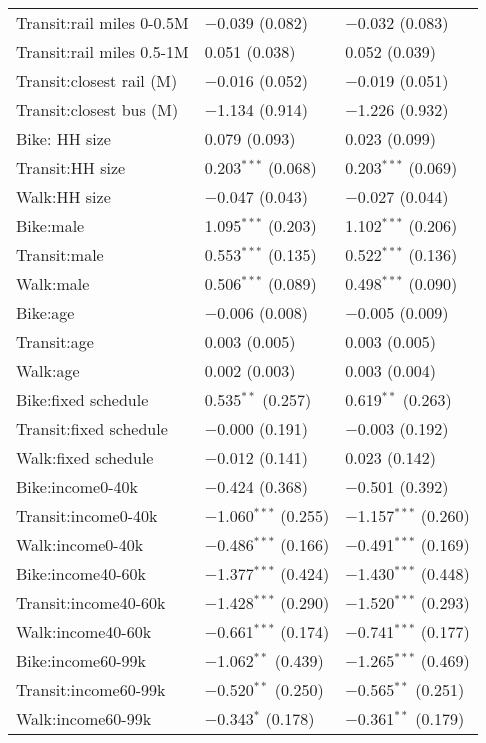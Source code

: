 \begin{longtabu}{lll}
 Transit:rail miles 0-0.5M & $-$0.039 (0.082) & $-$0.032 (0.083) \\ 
 Transit:rail miles 0.5-1M & 0.051 (0.038) & 0.052 (0.039) \\ 
 Transit:closest rail (M) & $-$0.016 (0.052) & $-$0.019 (0.051) \\ 
 Transit:closest bus (M) & $-$1.134 (0.914) & $-$1.226 (0.932) \\ 
 Bike: HH size & 0.079 (0.093) & 0.023 (0.099) \\ 
 Transit:HH size & 0.203$^{***}$ (0.068) & 0.203$^{***}$ (0.069) \\ 
 Walk:HH size & $-$0.047 (0.043) & $-$0.027 (0.044) \\ 
 Bike:male & 1.095$^{***}$ (0.203) & 1.102$^{***}$ (0.206) \\ 
 Transit:male & 0.553$^{***}$ (0.135) & 0.522$^{***}$ (0.136) \\ 
 Walk:male & 0.506$^{***}$ (0.089) & 0.498$^{***}$ (0.090) \\ 
 Bike:age & $-$0.006 (0.008) & $-$0.005 (0.009) \\ 
 Transit:age & 0.003 (0.005) & 0.003 (0.005) \\ 
 Walk:age & 0.002 (0.003) & 0.003 (0.004) \\ 
 Bike:fixed schedule & 0.535$^{**}$ (0.257) & 0.619$^{**}$ (0.263) \\ 
 Transit:fixed schedule & $-$0.000 (0.191) & $-$0.003 (0.192) \\ 
 Walk:fixed schedule & $-$0.012 (0.141) & 0.023 (0.142) \\ 
 Bike:income0-40k & $-$0.424 (0.368) & $-$0.501 (0.392) \\ 
 Transit:income0-40k & $-$1.060$^{***}$ (0.255) & $-$1.157$^{***}$ (0.260) \\ 
 Walk:income0-40k & $-$0.486$^{***}$ (0.166) & $-$0.491$^{***}$ (0.169) \\ 
 Bike:income40-60k & $-$1.377$^{***}$ (0.424) & $-$1.430$^{***}$ (0.448) \\ 
 Transit:income40-60k & $-$1.428$^{***}$ (0.290) & $-$1.520$^{***}$ (0.293) \\ 
 Walk:income40-60k & $-$0.661$^{***}$ (0.174) & $-$0.741$^{***}$ (0.177) \\ 
 Bike:income60-99k & $-$1.062$^{**}$ (0.439) & $-$1.265$^{***}$ (0.469) \\ 
 Transit:income60-99k & $-$0.520$^{**}$ (0.250) & $-$0.565$^{**}$ (0.251) \\ 
 Walk:income60-99k & $-$0.343$^{*}$ (0.178) & $-$0.361$^{**}$ (0.179) \\ 

\end{longtabu}
